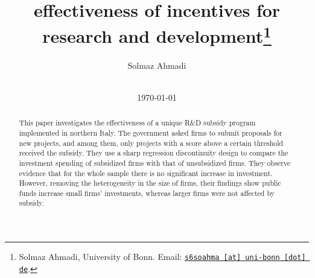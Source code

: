 \documentclass[11pt, a4paper, leqno]{article}
\begin{document}
\title{effectiveness of incentives for research and development\thanks{Solmaz Ahmadi, University of Bonn. Email: \href{mailto:s6soahma@uni-bonn.de}{\nolinkurl{s6soahma [at] uni-bonn [dot] de}}.}}

\author{Solmaz Ahmadi}

\date{
    {\bf }
    \\[1ex]
    \today
}

\maketitle


\begin{abstract}
    This paper investigates the effectiveness of a unique R&D subsidy program implemented in northern Italy.
    The government asked firms to submit proposals for new projects, and among them, only projects with a
    score above a certain threshold received the subsidy. They use a sharp regression discontinuity design
    to compare the investment spending of subsidized firms with that of unsubsidized firms. They observe
    evidence that for the whole sample there is no significant increase in investment. However, removing the
    heterogeneity in the size of firms, their findings show public funds increase small firms' investments,
    whereas larger firms were not affected by subsidy.
\end{abstract}
\clearpage
\end{document}
